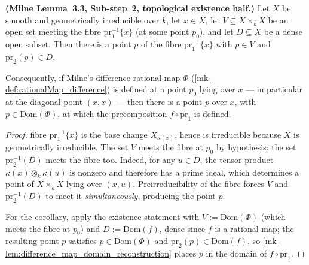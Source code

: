 \begin{lemma}\label{mk-lem:milne33_slice_existence}
  \leanok


  \textbf{(Milne Lemma~3.3, Sub-step~2, topological existence half.)} Let \(X\) be
  smooth and geometrically irreducible over \(\bar k\), let \(x \in X\), let
  \(V \subseteq X \times_{\bar k} X\) be an open set meeting the fibre
  \(\mathrm{pr}_1^{-1}\{x\}\) (at some point \(p_0\)), and let \(D \subseteq X\) be a
  dense open subset. Then there is a point \(p\) of the fibre
  \(\mathrm{pr}_1^{-1}\{x\}\) with \(p \in V\) and \(\mathrm{pr}_2(p) \in D\).

  Consequently, if Milne's difference rational map \(\Phi\)
  (\ref{mk-def:rationalMap_difference}) is defined at a point \(p_0\) lying over
  \(x\) --- in particular at the diagonal point \((x, x)\) --- then there is a
  point \(p\) over \(x\), with \(p \in \mathrm{Dom}(\Phi)\), at which the
  precomposition \(f \circ \mathrm{pr}_1\) is defined.
\end{lemma}
\begin{proof}
  \leanokThe fibre \(\mathrm{pr}_1^{-1}\{x\}\) is the base change
  \(X_{\kappa(x)}\), hence is irreducible because \(X\) is geometrically
  irreducible. The set \(V\) meets the fibre at \(p_0\) by hypothesis;
  the set \(\mathrm{pr}_2^{-1}(D)\) meets the fibre too. Indeed, for any
  \(u\in D\), the tensor product \(\kappa(x)\otimes_{\bar k}\kappa(u)\)
  is nonzero and therefore has a prime ideal, which determines a point of
  \(X\times_{\bar k}X\) lying over \((x,u)\).
  Preirreducibility of the fibre forces \(V\) and \(\mathrm{pr}_2^{-1}(D)\) to
  meet it \emph{simultaneously}, producing the point \(p\).

  For the corollary, apply the existence statement with \(V := \mathrm{Dom}(\Phi)\)
  (which meets the fibre at \(p_0\)) and \(D := \mathrm{Dom}(f)\), dense since
  \(f\) is a rational map; the resulting point \(p\) satisfies
  \(p \in \mathrm{Dom}(\Phi)\) and \(\mathrm{pr}_2(p) \in \mathrm{Dom}(f)\), so
  \ref{mk-lem:difference_map_domain_reconstruction} places \(p\) in the domain of
  \(f \circ \mathrm{pr}_1\).
\end{proof}

